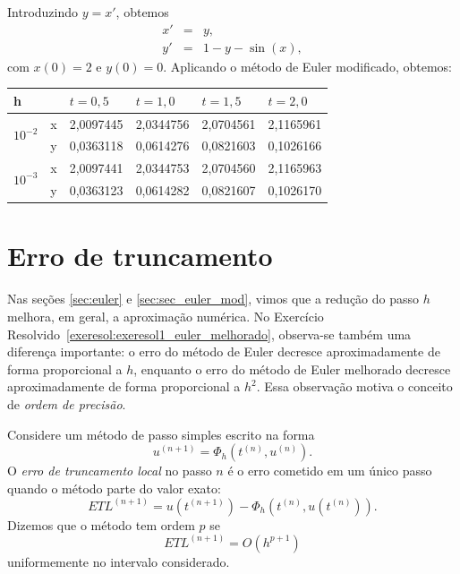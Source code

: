 \begin{resp}
Introduzindo $y=x'$, obtemos
\begin{eqnarray}
x'&=&y,\\
y'&=&1-y-\sin(x),
\end{eqnarray}
com $x(0)=2$ e $y(0)=0$. Aplicando o método de Euler modificado, obtemos:
\begin{center}
 \begin{tabular}{|l|l|l|l|l|l|}%
\hline
   h&&$t=0,5$&$t=1,0$&$t=1,5$&$t=2,0$\\
   \hline
   \multirow{2}{*}{$10^{-2}$} &x&2,0097445&2,0344756&2,0704561&2,1165961\\
                              &y&0,0363118&0,0614276&0,0821603&0,1026166\\
   \hline
   \multirow{2}{*}{$10^{-3}$} &x&2,0097441&2,0344753&2,0704560&2,1165963\\
                              &y&0,0363123&0,0614282&0,0821607&0,1026170\\
   \hline
   \end{tabular}
\end{center}
\end{resp}



\section{Erro de truncamento}\label{sec:erro_truncamento}
Nas seções \ref{sec:euler} e \ref{sec:sec_euler_mod}, vimos que a redução do passo $h$ melhora, em geral, a aproximação numérica. No Exercício Resolvido~\ref{exeresol:exeresol1_euler_melhorado}, observa-se também uma diferença importante: o erro do método de Euler decresce aproximadamente de forma proporcional a $h$, enquanto o erro do método de Euler melhorado decresce aproximadamente de forma proporcional a $h^2$. Essa observação motiva o conceito de \emph{ordem de precisão}.

\begin{defn}
Considere um método de passo simples escrito na forma
\begin{equation}
u^{(n+1)}=\Phi_h(t^{(n)},u^{(n)}).
\end{equation}
O \emph{erro de truncamento local} no passo $n$ é o erro cometido em um único passo quando o método parte do valor exato:
\begin{equation}
ETL^{(n+1)}=u(t^{(n+1)})-\Phi_h(t^{(n)},u(t^{(n)})).
\end{equation}
Dizemos que o método tem ordem $p$ se
\begin{equation}
ETL^{(n+1)}=O(h^{p+1})
\end{equation}
uniformemente no intervalo considerado.
\end{defn}

